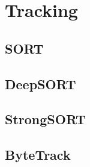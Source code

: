 \section{Tracking} 

  \subsection{SORT}

  \subsection{DeepSORT}

  \subsection{StrongSORT}

  \subsection{ByteTrack}

